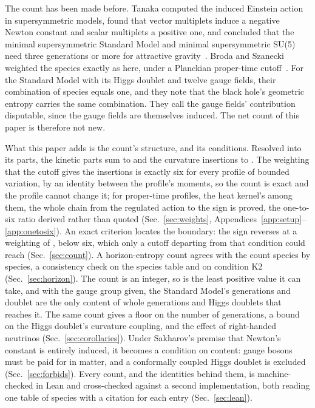 \documentclass[aps,prd,reprint,amsmath,amssymb,superscriptaddress,nofootinbib]{revtex4-2}
\begin{document}
The count has been made before. Tanaka computed the induced Einstein action in
supersymmetric models, found that vector multiplets induce a negative Newton constant
and scalar multiplets a positive one, and concluded that the minimal supersymmetric
Standard Model and minimal supersymmetric SU(5) need three generations or more for
attractive gravity~\cite{Tanaka1996}. Broda and Szanecki weighted the species exactly
as here, under a Planckian proper-time cutoff~\cite{BrodaSzanecki2009}. For the
Standard Model with its Higgs doublet and twelve gauge fields, their combination of
species equals one, and they note that the black hole's geometric entropy carries the
same combination. They call the gauge fields' contribution disputable, since the
gauge fields are themselves induced. The net count of this paper is therefore not
new.

What this paper adds is the count's structure, and its conditions. Resolved into its
parts, the kinetic parts sum to \smKinetic{} and the curvature insertions to
\smInsertion{}. The weighting that the cutoff gives the insertions is exactly six for
every profile of bounded variation, by an identity between the profile's moments, so
the count is exact and the profile cannot change it; for proper-time profiles, the
heat kernel's among them, the whole chain from the regulated action to the sign is
proved, the one-to-six ratio derived rather than quoted (Sec.~\ref{sec:weights},
Appendices~\ref{app:setup}--\ref{app:onetosix}). An exact criterion locates the
boundary: the sign reverses at a weighting of \smThreshold, \smMarginPct{} below six,
which only a cutoff departing from that condition could reach (Sec.~\ref{sec:count}).
A horizon-entropy count agrees with the count species by species, a consistency check
on the species table and on condition K2 (Sec.~\ref{sec:horizon}). The count is an
integer, so \smNet{} is the least positive value it can take, and with the gauge group
given, the Standard Model's generations and doublet are the only content of whole
generations and Higgs doublets that reaches it. The same count gives a floor on the
number of generations, a bound on the Higgs doublet's curvature coupling, and the
effect of right-handed neutrinos (Sec.~\ref{sec:corollaries}). Under Sakharov's
premise that Newton's constant is entirely induced, it becomes a condition on content:
gauge bosons must be paid for in matter, and a conformally coupled Higgs doublet is
excluded (Sec.~\ref{sec:forbids}).
Every count, and the identities behind them, is machine-checked in Lean and
cross-checked against a second implementation, both reading one table of species
with a citation for each entry (Sec.~\ref{sec:lean}).
\end{document}
